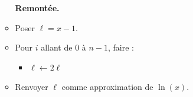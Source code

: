 \documentclass[11pt,class=report,crop=false]{standalone}
\begin{document}
\begin{activite}
\begin{enumerate}
\begin{algorithme}
\begin{itemize}
\begin{itemize}
  \end{itemize}
  
  \textbf{Remontée.}
  
  \item Poser $\ell = x - 1$.
  
  \item Pour $i$ allant de $0$ à $n-1$, faire :
  \begin{itemize}
    \item $\ell \leftarrow 2\ell$
      
  \end{itemize}
  
  \item Renvoyer $\ell$ comme approximation de $\ln(x)$.
    
 \end{itemize}  
 \end{algorithme}   
 
  
    \end{enumerate}
 
\end{activite}
\end{document}

